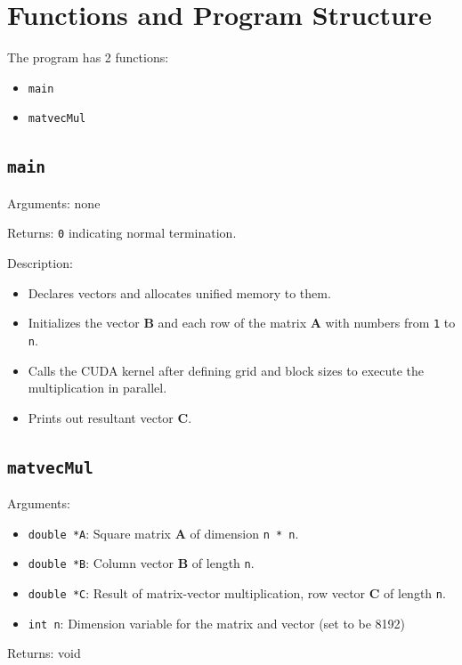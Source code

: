 \documentclass{article}
\begin{document}
\section{Functions and Program Structure}
The program has 2 functions:
\begin{itemize}
    \item \texttt{main}
    \item \texttt{matvecMul}
\end{itemize}

\subsection{\texttt{main}}
Arguments: none

\medskip
\noindent
Returns: \texttt{0} indicating normal termination.

\medskip
\noindent
Description: 
\begin{itemize}
    \item Declares vectors and allocates unified memory to them.

    \item Initializes the vector \textbf{B} and each row of the matrix 
    \textbf{A} with numbers from \texttt{1} to \texttt{n}.

    \item Calls the CUDA kernel after defining grid and block sizes to execute 
    the multiplication in parallel.
    
    \item Prints out resultant vector \textbf{C}.
\end{itemize}

\subsection{\texttt{matvecMul}}
Arguments: 
    \begin{itemize}
	    \item \texttt{double *A}: Square matrix \textbf{A} of dimension 
	    \texttt{n * n}.
	    
	    \item \texttt{double *B}: Column vector \textbf{B} of length \texttt{n}.
	    
	    \item \texttt{double *C}: Result of matrix-vector multiplication, row 
	    vector \textbf{C} of length \texttt{n}.
	    
	    \item \texttt{int n}: Dimension variable for the matrix and vector (set 
	    to be 8192)
    \end{itemize}
Returns: void
\end{document}
